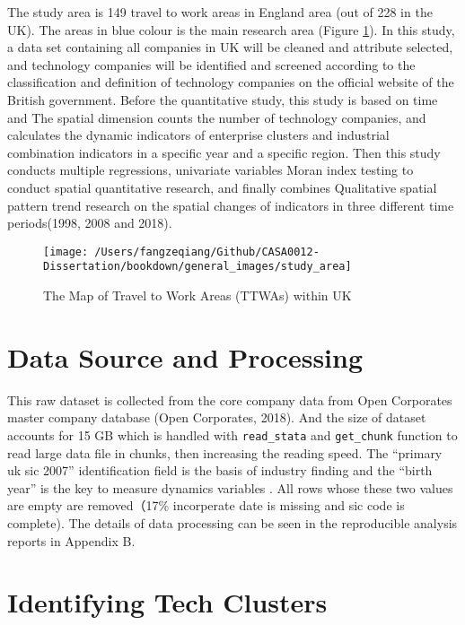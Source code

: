 \documentclass[
  12pt,
  oneside]{book}
\begin{document}
The study area is 149 travel to work areas in England area (out of 228 in the UK). The areas in blue colour is the main research area (Figure \ref{fig:fig-study-area}). In this study, a data set containing all companies in UK will be cleaned and attribute selected, and technology companies will be identified and screened according to the classification and definition of technology companies on the official website of the British government. Before the quantitative study, this study is based on time and The spatial dimension counts the number of technology companies, and calculates the dynamic indicators of enterprise clusters and industrial combination indicators in a specific year and a specific region. Then this study conducts multiple regressions, univariate variables Moran index testing to conduct spatial quantitative research, and finally combines Qualitative spatial pattern trend research on the spatial changes of indicators in three different time periods(1998, 2008 and 2018).

\begin{figure}
\texttt{[image: /Users/fangzeqiang/Github/CASA0012-Dissertation/bookdown/general\_images/study\_area]} \caption{The Map of Travel to Work Areas (TTWAs) within UK}\label{fig:fig-study-area}
\end{figure}

\hypertarget{data-source-and-processing}{%
\section{Data Source and Processing}\label{data-source-and-processing}}

This raw dataset is collected from the core company data from Open Corporates master company database (Open Corporates, 2018). And the size of dataset accounts for 15 GB which is handled with \texttt{read\_stata} and \texttt{get\_chunk} function to read large data file in chunks, then increasing the reading speed. The ``primary uk sic 2007'' identification field is the basis of industry finding and the ``birth year'' is the key to measure dynamics variables . All rows whose these two values are empty are removed（17\% incorperate date is missing and sic code is complete). The details of data processing can be seen in the reproducible analysis reports in Appendix B.

\hypertarget{identifying-tech-clusters}{%
\section{Identifying Tech Clusters}\label{identifying-tech-clusters}}
\end{document}

